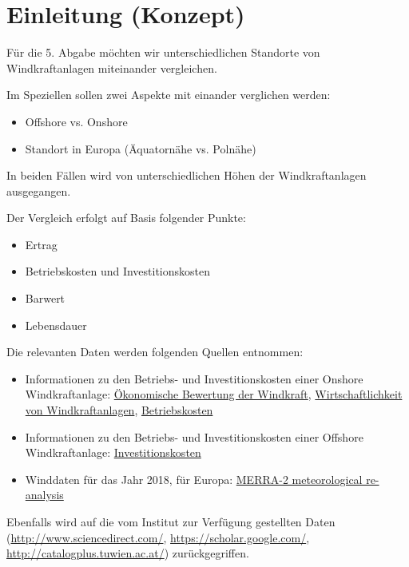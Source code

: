 \documentclass[a4paper,12pt]{article}
\begin{document}
	

	\newpage
	\tableofcontents

	\newpage
	
	\section{Einleitung (Konzept)}
	Für die 5. Abgabe möchten wir unterschiedlichen Standorte von Windkraftanlagen miteinander vergleichen.\\ \par
	\noindent Im Speziellen sollen zwei Aspekte mit einander verglichen werden:
	\begin{itemize}
		\item Offshore vs. Onshore
		\item Standort in Europa (Äquatornähe vs. Polnähe)
	\end{itemize}
	In beiden Fällen wird von unterschiedlichen Höhen der Windkraftanlagen ausgegangen.\\ \par
	\noindent Der Vergleich erfolgt auf Basis folgender Punkte:
	\begin{itemize}
		\item Ertrag
		\item Betriebskosten und Investitionskosten
		\item Barwert
		\item Lebensdauer
	\end{itemize}
	Die relevanten Daten werden folgenden Quellen entnommen:
	\begin{itemize}
		\item Informationen zu den Betriebs- und Investitionskosten einer Onshore Windkraftanlage: \href{https://www.diplomarbeitsboerse.info/wp-content/uploads/%C3%96konomische-Bewertung-der-Windkraft_Bsp-Gro%C3%9Fhofen.pdf}{Ökonomische Bewertung der Windkraft}, 
		\href{https://elite.tugraz.at/Jungbauer/6.htm}{Wirtschaftlichkeit von Windkraftanlagen},  \href{http://windmonitor.iee.fraunhofer.de/windmonitor_de/3_Onshore/5_betriebsergebnisse/4_betriebskosten/}{Betriebskosten}
		\item Informationen zu den Betriebs- und Investitionskosten einer Offshore Windkraftanlage:
		\href{http://windmonitor.iee.fraunhofer.de/windmonitor_de/4_Offshore/5_betriebsergebnisse/4_Investitionskosten/}{Investitionskosten}
		\item Winddaten für das Jahr 2018, für Europa:
		\href{http://www.soda-pro.com/web-services/meteo-data/merra}{MERRA-2 meteorological re-analysis}
	\end{itemize}
	Ebenfalls wird auf die vom Institut zur Verfügung gestellten Daten (\href{http://www.sciencedirect.com/}{http://www.sciencedirect.com/}, \href{https://scholar.google.com/}{https://scholar.google.com/}, \href{http://catalogplus.tuwien.ac.at/}{http://catalogplus.tuwien.ac.at/}) zurückgegriffen.
	
\end{document}
